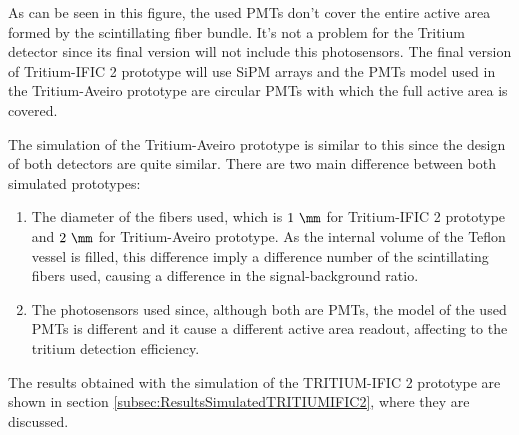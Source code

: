 As can be seen in this figure, the used PMTs don't cover the entire active area formed by the scintillating fiber bundle. It's not a problem for the Tritium detector since its final version will not include this photosensors. The final version of Tritium-IFIC 2 prototype will use SiPM arrays and the PMTs model used in the Tritium-Aveiro prototype are circular PMTs with which the full active area is covered.

The simulation of the Tritium-Aveiro prototype is similar to this since the design of both detectors are quite similar. There are two main difference between both simulated prototypes:

\begin{enumerate}

\item{} The diameter of the fibers used, which is $1~\mm$ for Tritium-IFIC 2 prototype and $2~\mm$ for Tritium-Aveiro prototype. As the internal volume of the Teflon vessel is filled, this difference imply a difference number of the scintillating fibers used, causing a difference in the signal-background ratio.

\item{} The photosensors used since, although both are PMTs, the model of the used PMTs is different and it cause a different active area readout, affecting to the tritium detection efficiency. 

\end{enumerate}

The results obtained with the simulation of the TRITIUM-IFIC 2 prototype are shown in section \ref{subsec:ResultsSimulatedTRITIUMIFIC2}, where they are discussed.